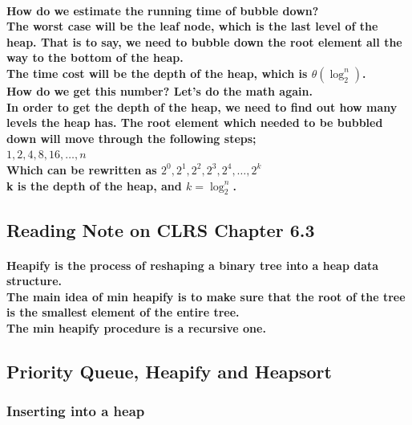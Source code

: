\documentclass{article}
\begin{document}
\paragraph{How do we estimate the running time of bubble down?\\
The worst case will be the leaf node, which is the last level of the heap. That is to say, we need to bubble down the root element all the way to the bottom of the heap.\\
The time cost will be the depth of the heap, which is $\theta(\log_2^n)$.\\
How do we get this number? Let's do the math again.\\
In order to get the depth of the heap, we need to find out how many levels the heap has.
The root element which needed to be bubbled down will move through the following steps;\\
$1,2,4,8,16, \ldots ,n$\\
Which can be rewritten as $2^0,2^1,2^2,2^3,2^4, \ldots ,2^k$\\
k is the depth of the heap, and $k = \log_2^n$.\\}

\subsection{Reading Note on CLRS Chapter 6.3}

\paragraph{Heapify is the process of reshaping a binary tree into a heap data structure.\\
The main idea of min heapify is to make sure that the root of the tree is the smallest element of the entire tree.\\
The min heapify procedure is a recursive one.\\}

\subsection{Priority Queue, Heapify and Heapsort}

\subsubsection{Inserting into a heap}
\end{document}
